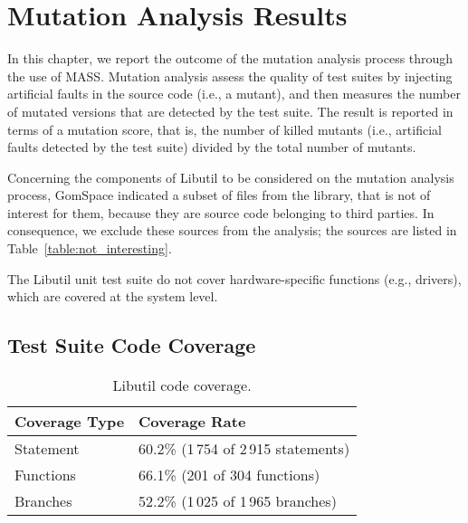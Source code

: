 
\chapter{Mutation Analysis Results}
\label{mass_output}



In this chapter, we report the outcome of the mutation analysis process through the use of MASS. 
Mutation analysis assess the quality of test suites by injecting artificial faults in the source code (i.e., a mutant), and then measures the number of mutated versions that are detected by the test suite. The result is reported in terms of a mutation score, that is, the number of killed mutants (i.e., artificial faults detected by the test suite) divided by the total number of mutants.




Concerning the components of Libutil to be considered on the mutation analysis process, GomSpace indicated a subset of files from the library, that is not of interest for them, because they are source code belonging to third parties. In consequence, we exclude these sources from the analysis; the sources are listed in Table~\ref{table:not_interesting}.

The Libutil unit test suite do not cover hardware-specific functions (e.g., drivers), which are covered at the system level.

\section{Test Suite Code Coverage}

\begin{table}[h]
\centering
\begin{tabular}{|l|l|}
\hline
\textbf{Coverage Type} & \textbf{Coverage Rate} \\
\hline
Statement     & 60.2\% (1\,754 of 2\,915 statements)\\
Functions     & 66.1\% (201 of 304 functions)\\
Branches      & 52.2\% (1\,025 of 1\,965 branches)\\
\hline
\end{tabular}
\caption{Libutil code coverage.}
\label{table:gslibutil_coverage}
\end{table}

